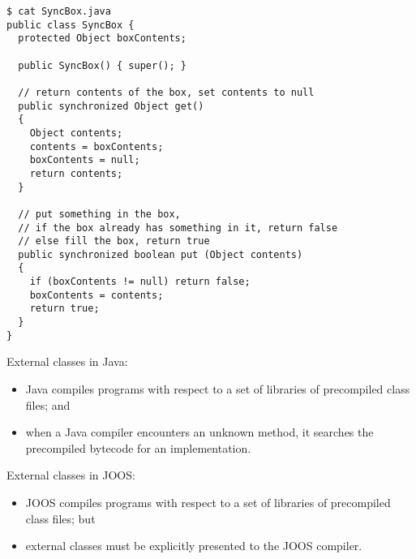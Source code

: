 \begin{slide*}
\begin{scriptsize}
\begin{verbatim}
$ cat SyncBox.java
public class SyncBox {
  protected Object boxContents;
 
  public SyncBox() { super(); }
 
  // return contents of the box, set contents to null
  public synchronized Object get()
  { 
    Object contents;
    contents = boxContents;
    boxContents = null;
    return contents;
  }
 
  // put something in the box,
  // if the box already has something in it, return false
  // else fill the box, return true
  public synchronized boolean put (Object contents)
  { 
    if (boxContents != null) return false;
    boxContents = contents;
    return true;
  }
}
\end{verbatim}
\end{scriptsize}
\vfil
\end{slide*}

\begin{slide*}
External classes in Java:
\begin{itemize}
\item Java compiles programs with respect to a set of libraries of precompiled
       class files; and
\item when a Java compiler encounters an unknown method, it searches the precompiled
bytecode for an implementation.
\end{itemize}

External classes in JOOS:
\begin{itemize}
\item JOOS compiles programs with respect to a set of libraries of precompiled
       class files; but
\item external classes must be explicitly presented to the JOOS compiler.
\end{itemize}
\vfil
\end{slide*}

